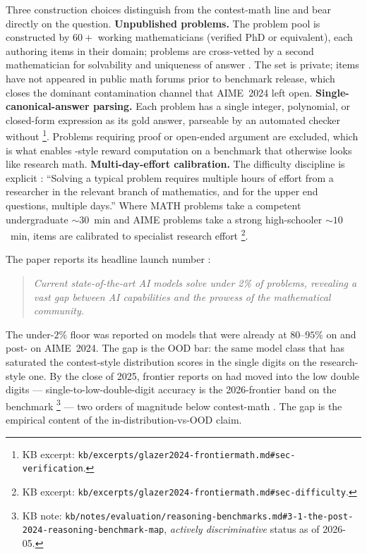 Three construction choices distinguish  from the
contest-math line and bear directly on the  question.
\textbf{Unpublished problems.} The problem pool is constructed by
$60+$ working mathematicians (verified PhD or equivalent), each
authoring items in their domain; problems are cross-vetted by a
second mathematician for solvability and uniqueness of answer
\citep[\S{}sec-verification]{glazer2024-frontiermath}. The set is
private; items have not appeared in public math forums prior to
benchmark release, which closes the dominant contamination channel
that AIME~2024 left open.
\textbf{Single-canonical-answer parsing.} Each problem has a
single integer, polynomial, or closed-form expression as its gold
answer, parseable by an automated checker without %
\footnote{KB excerpt: \nolinkurl{kb/excerpts/glazer2024-frontiermath.md#sec-verification}.}.
Problems requiring proof or open-ended argument are excluded, which
is what enables -style reward computation on a benchmark that
otherwise looks like research math.
\textbf{Multi-day-effort calibration.} The difficulty discipline is
explicit \citep[\S{}sec-difficulty]{glazer2024-frontiermath}:
``Solving a typical problem requires multiple hours of effort from a
researcher in the relevant branch of mathematics, and for the upper
end questions, multiple days.'' Where MATH problems take a competent
undergraduate $\sim 30$~min and AIME problems take a strong
high-schooler $\sim 10$~min,  items are calibrated to
specialist research effort%
\footnote{KB excerpt: \nolinkurl{kb/excerpts/glazer2024-frontiermath.md#sec-difficulty}.}.

The paper reports its headline launch number
\citep[\S{}abstract,\S{}sec-launch-result]{glazer2024-frontiermath}:

\begin{quote}\itshape
Current state-of-the-art AI models solve under 2\% of problems,
revealing a vast gap between AI capabilities and the prowess of the
mathematical community.
\end{quote}

The under-$2\%$ floor was reported on models that were already at
$80$--$95\%$ on  and post- on AIME~2024. The gap is
the OOD bar: the same model class that has saturated the
contest-style distribution scores in the single digits on the
research-style one. By the close of 2025, frontier 
reports on  had moved into the low double digits ---
single-to-low-double-digit accuracy is the 2026-frontier band on the
benchmark%
\footnote{KB note: \nolinkurl{kb/notes/evaluation/reasoning-benchmarks.md#3-1-the-post-2024-reasoning-benchmark-map}, \emph{actively discriminative} status as of 2026-05.}
--- two orders of magnitude below contest-math . The gap
is the empirical content of the in-distribution-vs-OOD claim.

